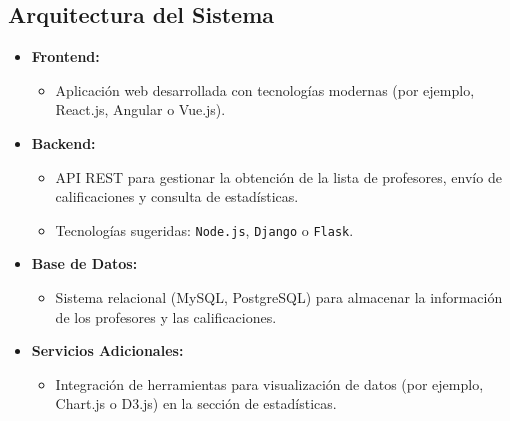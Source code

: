 \documentclass[11pt]{article}
\begin{document}
\subsection{Arquitectura del Sistema}
\begin{itemize}
    \item \textbf{Frontend:}
    \begin{itemize}
        \item Aplicación web desarrollada con tecnologías modernas (por ejemplo, React.js, Angular o Vue.js).
    \end{itemize}
    \item \textbf{Backend:}
    \begin{itemize}
        \item API REST para gestionar la obtención de la lista de profesores, envío de calificaciones y consulta de estadísticas.
        \item Tecnologías sugeridas: \texttt{Node.js}, \texttt{Django} o \texttt{Flask}.
    \end{itemize}
    \item \textbf{Base de Datos:}
    \begin{itemize}
        \item Sistema relacional (MySQL, PostgreSQL) para almacenar la información de los profesores y las calificaciones.
    \end{itemize}
    \item \textbf{Servicios Adicionales:}
    \begin{itemize}
        \item Integración de herramientas para visualización de datos (por ejemplo, Chart.js o D3.js) en la sección de estadísticas.
    \end{itemize}
\end{itemize}
\end{document}
